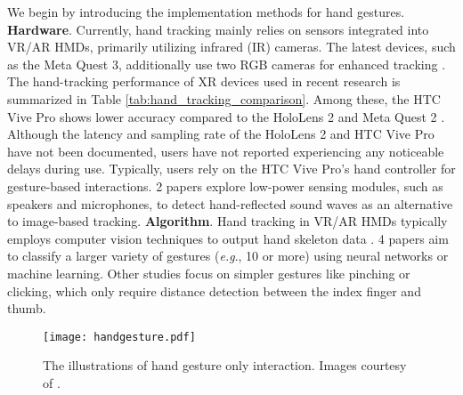 \documentclass[review]{fcs}
\newcommand{\revise}[2]{\textcolor[rgb]{0,0,0}{#2}}
\begin{document}
We begin by introducing the implementation methods for hand gestures.
\textbf{Hardware}. Currently, hand tracking mainly relies on sensors integrated into VR/AR HMDs, primarily utilizing infrared (IR) cameras. The latest devices, such as the Meta Quest 3, additionally use two RGB cameras for enhanced tracking \cite{Meta}. 
\revise{}{The hand-tracking performance of XR devices used in recent research is summarized in Table \ref{tab:hand_tracking_comparison}. Among these, the HTC Vive Pro shows lower accuracy compared to the HoloLens 2 and Meta Quest 2 \cite{10.1145/3485279.3485283}. Although the latency and sampling rate of the HoloLens 2 and HTC Vive Pro have not been documented, users have not reported experiencing any noticeable delays during use. Typically, users rely on the HTC Vive Pro's hand controller for gesture-based interactions.}
\revise{2 paper explores low-power sensing modules, such as speakers and microphones, to detect hand-reflected sound waves as an alternative to image-based tracking \cite{DBLP:conf/chi/LeeZAYGLKYDLSGZ24, 10522613}.}{2 papers \cite{DBLP:conf/chi/LeeZAYGLKYDLSGZ24, 10522613} explore low-power sensing modules, such as speakers and microphones, to detect hand-reflected sound waves as an alternative to image-based tracking.}
\textbf{Algorithm}. Hand tracking in VR/AR HMDs typically employs computer vision techniques to output hand skeleton data \cite{cai2020generalizing, cai2018desktop}. 
\revise{4 papers aimed to classify a larger variety of gestures (\textit{e.g}., 10 or more) using neural networks or machine learning \cite{DBLP:journals/tvcg/SongDK23, DBLP:conf/chi/PeiCLZ22, DBLP:journals/tvcg/ShenDMK22,DBLP:conf/chi/LeeZAYGLKYDLSGZ24}.}{4 papers \cite{DBLP:journals/tvcg/SongDK23, DBLP:conf/chi/PeiCLZ22, DBLP:journals/tvcg/ShenDMK22,DBLP:conf/chi/LeeZAYGLKYDLSGZ24} aim to classify a larger variety of gestures (\textit{e.g}., 10 or more) using neural networks or machine learning.} 
\revise{Other studies focused on simpler gestures, like pinching or clicking, which require only distance detection between the index finger and thumb.}{Other studies focus on simpler gestures like pinching or clicking, which only require distance detection between the index finger and thumb.}

\begin{figure}[t]
    \centering
    \texttt{[image: handgesture.pdf]}
    \caption{\revise{}{ The illustrations of hand gesture only interaction. Images courtesy of \cite{DBLP:conf/chi/PeiCLZ22, DBLP:conf/vr/SinJLLLN24}.}}
    \label{Hand}
\end{figure}
\end{document}
